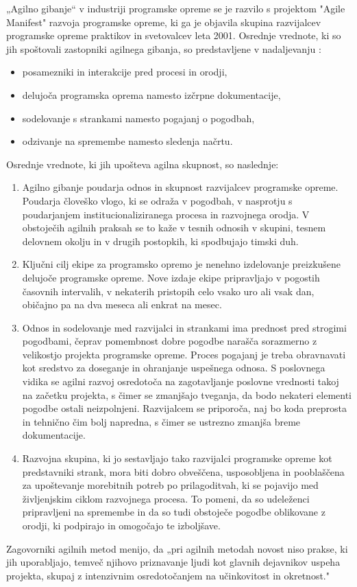 \documentclass[a4paper,12pt,openright]{book}
\begin{document}
„Agilno gibanje“ v industriji programske opreme se je razvilo s projektom "Agile Manifest" razvoja programske opreme, ki ga je objavila skupina razvijalcev programske opreme praktikov in svetovalcev leta 2001. Osrednje vrednote, ki so jih spoštovali zastopniki agilnega gibanja, so predstavljene v nadaljevanju \cite{highsmith2009agile}:
\begin{itemize}
    \item posamezniki in interakcije pred procesi in orodji,
    \item delujoča programska oprema namesto izčrpne dokumentacije,
    \item sodelovanje s strankami namesto pogajanj o pogodbah,
    \item odzivanje na spremembe namesto sledenja načrtu.
\end{itemize}
Osrednje vrednote, ki jih upošteva agilna skupnost, so naslednje:
\begin{enumerate}
    \item Agilno gibanje poudarja odnos in skupnost razvijalcev programske opreme. Poudarja človeško vlogo, ki se odraža v pogodbah, v nasprotju  s poudarjanjem institucionaliziranega procesa in razvojnega orodja. V obstoječih agilnih praksah se to kaže v tesnih odnosih v skupini, tesnem delovnem okolju in v drugih postopkih, ki spodbujajo timski duh.
    \item Ključni cilj ekipe za programsko opremo je nenehno izdelovanje preizkušene delujoče programske opreme. Nove izdaje ekipe pripravljajo v pogostih časovnih intervalih, v nekaterih pristopih celo vsako uro ali vsak dan, običajno pa na dva meseca ali enkrat na mesec. 
    \item Odnos in sodelovanje med razvijalci in strankami ima prednost pred strogimi pogodbami, čeprav pomembnost dobre pogodbe narašča sorazmerno z velikostjo projekta programske opreme.
    Proces pogajanj je treba obravnavati kot sredstvo za doseganje in ohranjanje uspešnega odnosa. S poslovnega vidika se agilni razvoj osredotoča na zagotavljanje poslovne vrednosti takoj na začetku projekta, s čimer se zmanjšajo tveganja, da bodo nekateri elementi pogodbe ostali neizpolnjeni. Razvijalcem se priporoča, naj bo koda preprosta in tehnično čim bolj napredna, s čimer se ustrezno zmanjša breme dokumentacije.
    \item Razvojna skupina, ki jo sestavljajo tako razvijalci programske opreme kot predstavniki strank, mora biti dobro obveščena, usposobljena in pooblaščena za upoštevanje morebitnih potreb po prilagoditvah, ki se pojavijo med življenjskim ciklom razvojnega procesa. To pomeni, da so udeleženci pripravljeni na spremembe in da so tudi obstoječe pogodbe oblikovane z orodji, ki podpirajo in omogočajo te izboljšave.
\end{enumerate}
Zagovorniki agilnih metod menijo, da „pri agilnih metodah novost niso prakse, ki jih uporabljajo, temveč njihovo priznavanje ljudi kot glavnih dejavnikov uspeha projekta, skupaj z intenzivnim osredotočanjem na učinkovitost in okretnost." 
\cite{DBLP:journals/corr/abs-1709-08439}
\end{document}

